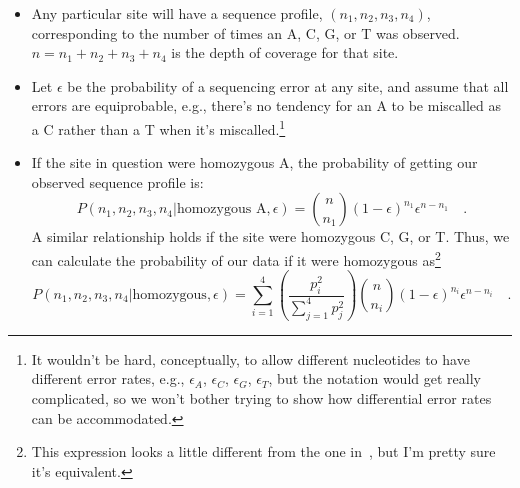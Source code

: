 \begin{itemize}

\item Any particular site will have a sequence profile, $(n_1, n_2,
  n_3, n_4)$, corresponding to the number of times an A, C, G, or T
  was observed. $n=n_1+n_2+n_3+n_4$ is the depth of coverage for that
  site. 

\item Let $\epsilon$ be the probability of a sequencing error at any
  site, and assume that all errors are equiprobable, e.g., there's no
  tendency for an A to be miscalled as a C rather than a T when it's
  miscalled.\footnote{It wouldn't be hard, conceptually, to allow
    different nucleotides to have different error rates, e.g.,
    $\epsilon_A$, $\epsilon_C$, $\epsilon_G$, $\epsilon_T$, but the
    notation would get really complicated, so we won't bother trying
    to show how differential error rates can be accommodated.} 

\item If the site in question were homozygous A, the probability of
  getting our observed sequence profile is:
\[
P(n_1,n_2,n_3,n_4|\mbox{homozygous A},\epsilon)
=
{n \choose n_1}(1-\epsilon)^{n_1}\epsilon^{n-n_1} \quad .
\]
A similar relationship holds if the site were homozygous C, G, or
T. Thus, we can calculate the probability of our data if it were homozygous
as\footnote{This expression
    looks a little different from the one in~\cite{Lynch-2008}, but
    I'm pretty sure it's equivalent.}
\[
P(n_1,n_2,n_3,n_4|\mbox{homozygous},\epsilon)
=
\sum_{i=1}^4 \left(\frac{p_i^2}{\sum_{j=1}^4p_j^2}\right) 
{n \choose n_i}(1-\epsilon)^{n_i}\epsilon^{n-n_i}
\quad .
\]


\end{itemize}
